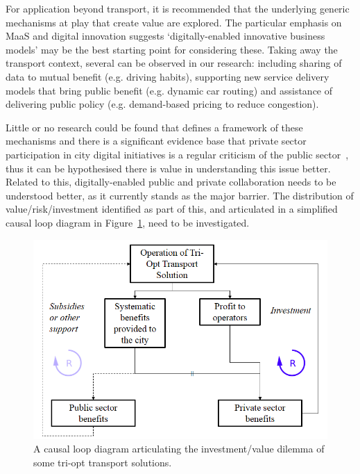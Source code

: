 \documentclass[journal]{IEEEtran}
\begin{document}
For application beyond transport, it is recommended that the
underlying generic mechanisms at play that create value are
explored. The particular emphasis on MaaS and digital innovation
suggests `digitally-enabled innovative business models' may be the
best starting point for considering these. Taking away the transport
context, several can be observed in our research: including sharing of
data to mutual benefit (e.g. driving habits), supporting new service
delivery models that bring public benefit (e.g. dynamic car routing)
and assistance of delivering public policy (e.g. demand-based pricing
to reduce congestion).

Little or no research could be found that defines a framework of these
mechanisms and there is a significant evidence base that private
sector participation in city digital initiatives is a regular
criticism of the public sector~\cite{martin:2016}, thus it
can be hypothesised there is value in understanding this issue
better. Related to this, digitally-enabled public and private
collaboration needs to be understood better, as it currently stands as
the major barrier. The distribution of value/risk/investment
identified as part of this, and articulated in a simplified causal
loop diagram in Figure~\ref{fig:causalloop}, need to be investigated.

\begin{figure}[!htb]
\centering
\includegraphics[width=\columnwidth]{images/causalloop.png}
\caption{A causal loop diagram articulating the investment/value
  dilemma of some tri-opt transport solutions.}
\label{fig:causalloop}
\end{figure}

\end{document}

